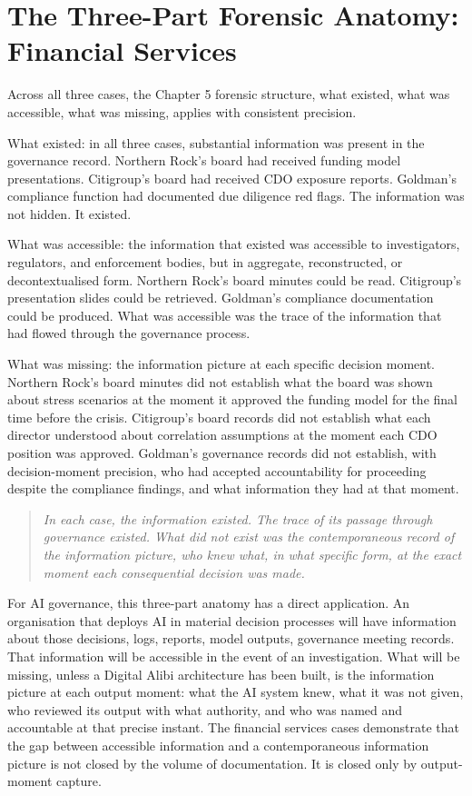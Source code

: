 \scenebreak

\section{The Three-Part Forensic Anatomy: Financial Services}

Across all three cases, the Chapter 5 forensic structure, what existed, what was accessible, what was missing, applies with consistent precision.

What existed: in all three cases, substantial information was present in the governance record. Northern Rock's board had received funding model presentations. Citigroup's board had received CDO exposure reports. Goldman's compliance function had documented due diligence red flags. The information was not hidden. It existed.

What was accessible: the information that existed was accessible to investigators, regulators, and enforcement bodies, but in aggregate, reconstructed, or decontextualised form. Northern Rock's board minutes could be read. Citigroup's presentation slides could be retrieved. Goldman's compliance documentation could be produced. What was accessible was the trace of the information that had flowed through the governance process.

What was missing: the information picture at each specific decision moment. Northern Rock's board minutes did not establish what the board was shown about stress scenarios at the moment it approved the funding model for the final time before the crisis. Citigroup's board records did not establish what each director understood about correlation assumptions at the moment each CDO position was approved. Goldman's governance records did not establish, with decision-moment precision, who had accepted accountability for proceeding despite the compliance findings, and what information they had at that moment.

\begin{quote}
\emph{In each case, the information existed. The trace of its passage through governance existed. What did not exist was the contemporaneous record of the information picture, who knew what, in what specific form, at the exact moment each consequential decision was made.}
\end{quote}

For AI governance, this three-part anatomy has a direct application. An organisation that deploys AI in material decision processes will have information about those decisions, logs, reports, model outputs, governance meeting records. That information will be accessible in the event of an investigation. What will be missing, unless a Digital Alibi architecture has been built, is the information picture at each output moment: what the AI system knew, what it was not given, who reviewed its output with what authority, and who was named and accountable at that precise instant. The financial services cases demonstrate that the gap between accessible information and a contemporaneous information picture is not closed by the volume of documentation. It is closed only by output-moment capture.

